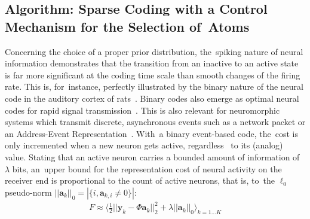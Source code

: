 \documentclass[vision,article,accept,oneauthor,pdftex]{Definitions/mdpi}
\newcommand{\coef}{\mathbf{a}} %
\newcommand{\image}{\mathbf{y}} %
\newcommand{\dico}{\Phi} %
\newcommand{\enscond}[2]{\lbrace #1, #2 \rbrace}
\newcommand{\norm}[1]{|\!| #1 |\!|}
\newcommand{\abs}[1]{\left|#1\right|}
\begin{document}
\subsection{Algorithm: Sparse Coding with a Control Mechanism for the Selection of~Atoms}
Concerning the choice of a proper prior distribution, the~spiking nature of neural information demonstrates that the transition from an inactive to an active state is far more significant at the coding time scale than smooth changes of the firing rate. This is, for~instance, perfectly illustrated by the binary nature of the neural code in the auditory cortex of rats~\citep{DeWeese03}. Binary codes also emerge as optimal neural codes for rapid signal transmission~\citep{Bethge03}. This is also relevant for neuromorphic systems which transmit discrete, asynchronous events such as a network packet or an Address-Event Representation~\citep{Khoei19}. With~a binary event-based code, the~cost is only incremented when a new neuron gets active, regardless~ to its (analog) value. Stating that an active neuron carries a bounded amount of information of $\lambda$ bits, an~upper bound for the representation cost of neural activity on the receiver end is proportional to the count of active neurons, that is, to~the $\ell_0$ pseudo-norm $\norm{\coef_{k}}_0 = \abs{\enscond{i}{\coef_{k, i} \neq 0}}$:%
\begin{align}%
F \approx  \langle \frac{1}{2} \norm{\image_k - \dico \coef_{k}}_2^2 + \lambda\norm{\coef_{k}}_0 \rangle_{k = 1 \ldots K}%
\label{eq:L0_cost}%
\end{align}%
\end{document}

